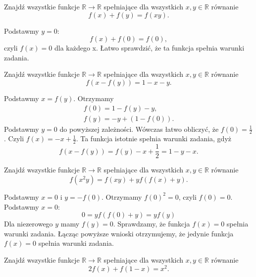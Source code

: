 \newpage
{}

\begin{problem}{1} 
	Znajdź wszystkie funkcje $\mathbb{R} \rightarrow \mathbb{R} $ spełniające dla wszystkich $x, y \in \mathbb{R} $ równanie
	\[
		 f(x)+f(y) = f(xy).
	\]
\end{problem}


\noindent
Podstawmy $y=0$: \[ f(x) + f(0) = f(0), \] czyli $f(x) = 0 $ dla każdego x. Łatwo sprawdzić, że ta funkcja spełnia warunki zadania. 

\vspace{10px}

\begin{problem}{2}
	Znajdź wszystkie funkcje $\mathbb{R} \rightarrow \mathbb{R} $ spełniające dla wszystkich $x, y \in \mathbb{R} $ równanie
	\[
		 f(x-f(y)) = 1 - x - y.
	\]
\end{problem}

\noindent
Podstawmy $x = f(y)$. Otrzymamy 
\begin{gather*}
	f(0) = 1 - f(y) - y, \\
	f(y) = - y + (1 - f(0)).
\end{gather*} 
Podstawmy $y = 0$ do powyższej zależności. Wówczas łatwo obliczyć, że $f(0)=\frac{1}{2}$. Czyli $f(x) = - x + \frac{1}{2} $. Ta funkcja istotnie spełnia warunki zadania, gdyż
\[
	f(x - f(y)) = f(y) - x + \frac{1}{2} = 1 - y - x .
\]

\begin{problem}{3}
	Znajdź wszystkie funkcje $\mathbb{R} \rightarrow \mathbb{R} $ spełniające dla wszystkich $x, y \in \mathbb{R} $ równanie 
	\[
		f(x^{2}y) = f(xy) + yf(f(x) + y).
	\]
\end{problem}


\noindent
Podstawmy $x = 0$ i $y = -f(0)$. Otrzymamy $f(0)^{2}=0$, czyli $f(0)=0$. Podstawmy $x=0$: 
\[ 
	0 = yf(f(0) + y) = yf(y)
\] 
Dla niezerowego $y$ mamy $f(y) = 0$.
Sprawdzamy, że funkcja $f(x) = 0$ spełnia warunki zadania. Łącząc powyższe wnioski otrzymujemy, że jedynie funkcja $f(x)=0$ spełnia warunki zadania. 

\newpage

\begin{problem}{4}
	Znajdź wszystkie funkcje $\mathbb{R} \rightarrow \mathbb{R} $ spełniające dla wszystkich $x, y \in \mathbb{R} $ równanie 
	\[
		2f(x) + f(1 - x) = x^{2}.
	\] 
\end{problem}

